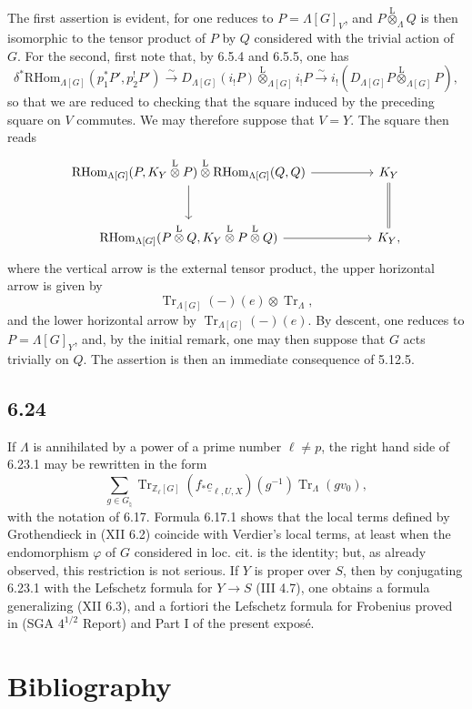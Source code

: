 \documentclass[11pt]{article}
\providecommand{\RHom}{\mathrm{RHom}}
\providecommand{\Tr}{\operatorname{Tr}}
\providecommand{\Tr}{\operatorname{Tr}}
\providecommand{\lten}{\overset{\mathrm L}{\otimes}}
\providecommand{\Tr}{\operatorname{Tr}}
\providecommand{\RHom}{\mathrm{RHom}}
\providecommand{\lten}{\overset{\mathrm L}{\otimes}}
\providecommand{\RHom}{\mathrm R\mathcal{H}om}
\providecommand{\lten}{\overset{\mathrm L}{\otimes}}
\providecommand{\Tr}{\operatorname{Tr}}
\providecommand{\lten}{\overset{\mathrm L}{\otimes}}
\providecommand{\lten}{\overset{\mathrm L}{\otimes}}
\providecommand{\lten}{\overset{\mathrm L}{\otimes}}
\providecommand{\RHom}{\mathrm{RHom}}
\begin{document}
The first assertion is evident, for one reduces to $P=\Lambda[G]_V$, and $P\lten_{\Lambda}Q$ is then isomorphic to the tensor product of $P$ by $Q$ considered with the trivial action of $G$. For the second, first note that, by 6.5.4 and 6.5.5, one has
\[
\delta^*\RHom_{\Lambda[G]}(p_1^*P',p_2^!P')
\xrightarrow{\sim}
D_{\Lambda[G]}(i_!P)\lten_{\Lambda[G]} i_!P
\xrightarrow{\sim}
i_!(D_{\Lambda[G]}P\lten_{\Lambda[G]}P),
\]
so that we are reduced to checking that the square induced by the preceding square on $V$ commutes. We may therefore suppose that $V=Y$. The square then reads
\[
\begin{tikzcd}[column sep=huge,row sep=large]
\RHom_{\Lambda[G]}(P,K_Y\lten P)\lten\RHom_{\Lambda[G]}(Q,Q) \arrow[r] \arrow[d]
& K_Y \arrow[d,equal]\\
\RHom_{\Lambda[G]}(P\lten Q,K_Y\lten P\lten Q) \arrow[r]
& K_Y ,
\end{tikzcd}
\]
where the vertical arrow is the external tensor product, the upper horizontal arrow is given by
\[
\Tr_{\Lambda[G]}(-)(e)\otimes\Tr_{\Lambda},
\]
and the lower horizontal arrow by $\Tr_{\Lambda[G]}(-)(e)$. By descent, one reduces to $P=\Lambda[G]_Y$, and, by the initial remark, one may then suppose that $G$ acts trivially on $Q$. The assertion is then an immediate consequence of 5.12.5.

\subsection*{6.24}
If $\Lambda$ is annihilated by a power of a prime number $\ell\ne p$, the right hand side of 6.23.1 may be rewritten in the form
\[
\sum_{g\in G_{\natural}}
\Tr_{\mathbb Z_{\ell}[G]}(f_*\underline c_{\ell,U,X})(g^{-1})
\Tr_{\Lambda}(gv_0),
\]
with the notation of 6.17. Formula 6.17.1 shows that the local terms defined by Grothendieck in (XII 6.2) coincide with Verdier's local terms, at least when the endomorphism $\varphi$ of $G$ considered in loc. cit. is the identity; but, as already observed, this restriction is not serious. If $Y$ is proper over $S$, then by conjugating 6.23.1 with the Lefschetz formula for $Y\to S$ (III 4.7), one obtains a formula generalizing (XII 6.3), and a fortiori the Lefschetz formula for Frobenius proved in (SGA $4^{1/2}$ Report) and Part I of the present exposé.

\section*{Bibliography}
\end{document}
